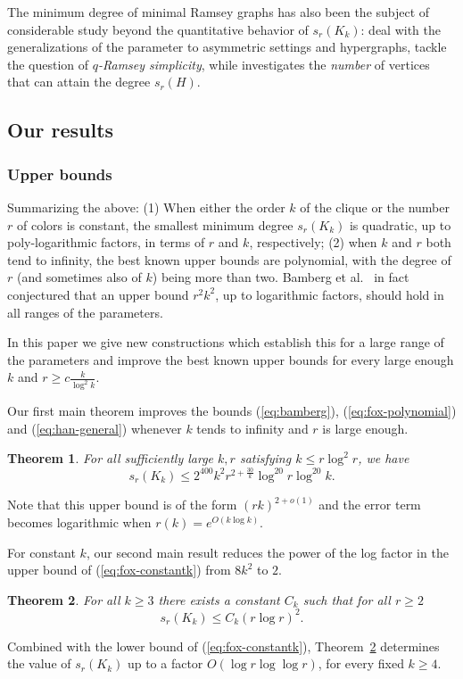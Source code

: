\documentclass[12pt]{article}
\newtheorem{theorem}{Theorem}
\theoremstyle{definition}
\begin{document}
	The minimum degree of minimal Ramsey graphs has also been the subject of considerable study beyond the quantitative behavior of $s_r(K_k)$: \cite{bishnoi2023minimum, clemens2015minimum} deal with the generalizations of the parameter to asymmetric settings and hypergraphs, \cite{szabo2010minimum, boyadzhiyska2025ramsey, grinshpun2017minimum} tackle the question of \textit{$q$-Ramsey simplicity}, while \cite{boyadzhiyska2022minimal} investigates the {\em number} of vertices that can attain the degree $s_r(H)$.
	
	
	\subsection{Our results} 
	
	\subsubsection{Upper bounds}
	Summarizing the above: (1) When either the order $k$ of the clique or the number $r$ of colors is constant, the smallest minimum degree $s_r(K_{k})$ is quadratic, up to poly-logarithmic factors, in terms of $r$ and $k$, respectively; (2) when $k$ and $r$ both tend to infinity, the best known upper bounds are polynomial, with the degree of $r$ (and sometimes also of $k$) being more than two.  
	Bamberg et al.\ \cite{bamberg2022minimum} in fact conjectured that an upper bound $r^2k^2$, up to logarithmic factors, should hold in all ranges of the parameters. 
	
	In this paper we give new constructions which establish this for a large range of the parameters and improve the best known upper bounds for every large enough $k$ and $r\geq c \frac{k}{\log^2 k}$.
	
	Our first main theorem improves the bounds (\ref{eq:bamberg}), (\ref{eq:fox-polynomial}) and (\ref{eq:han-general}) whenever $k$ tends to infinity and $r$ is large enough.
	\begin{theorem}\label{thm: MinDegGen}
		For all sufficiently large $k,r$ satisfying $k \leq r \log^2 r$, we have 
		\[s_r(K_{k}) \leq 2^{400} k^2r^{2+\frac{30}{k}} \log^{20}r\log^{20}k.\]
	\end{theorem}
	Note that this upper bound is of the form $(rk)^{2+o(1)}$ and the error term becomes logarithmic when $r(k) = e^{O(k\log k)}$. 
	
	For constant $k$, our second main result reduces the power of the log factor in the upper bound of (\ref{eq:fox-constantk}) from $8k^2$ to $2$.
	\begin{theorem}\label{thm: MinDegConst}
		For all $k \geq 3$ there exists a constant $C_k$ such that for all $r \geq 2$
		\[s_r(K_{k}) \leq C_k (r\log r)^2. \]
	\end{theorem}
	Combined with the lower bound of (\ref{eq:fox-constantk}), Theorem~\ref{thm: MinDegConst} determines the value of $s_r(K_k)$ up to a factor $O(\log r \log\log r)$, for every fixed $k\geq 4$. 
	
\end{document}
